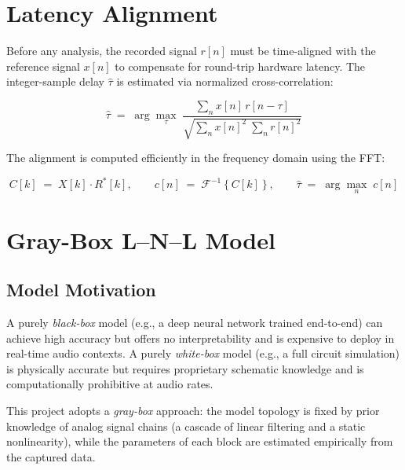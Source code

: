 \documentclass[11pt, letterpaper]{article}
\begin{document}
\section{Latency Alignment}
\label{sec:latency}

Before any analysis, the recorded signal $r[n]$ must be time-aligned with the
reference signal $x[n]$ to compensate for round-trip hardware latency.
The integer-sample delay $\hat{\tau}$ is estimated via normalized
cross-correlation:

\begin{equation}
    \hat{\tau} \;=\; \arg\max_{\tau} \;
    \frac{\displaystyle\sum_{n} x[n]\, r[n - \tau]}
         {\sqrt{\displaystyle\sum_{n} x[n]^{2}\;
                \displaystyle\sum_{n} r[n]^{2}}}
    \label{eq:xcorr}
\end{equation}

The alignment is computed efficiently in the frequency domain using the FFT:

\begin{equation}
    C[k] \;=\; X[k] \cdot R^{*}[k],
    \qquad
    c[n] \;=\; \mathcal{F}^{-1}\!\left\{C[k]\right\},
    \qquad
    \hat{\tau} \;=\; \arg\max_{n}\; c[n]
    \label{eq:xcorr_fft}
\end{equation}


\section{Gray-Box L--N--L Model}
\label{sec:lnl}

\subsection{Model Motivation}
\label{sec:lnl_motivation}

A purely \emph{black-box} model (e.g., a deep neural network trained end-to-end)
can achieve high accuracy but offers no interpretability and is expensive to
deploy in real-time audio contexts.  A purely \emph{white-box} model (e.g., a
full circuit simulation) is physically accurate but requires proprietary
schematic knowledge and is computationally prohibitive at audio rates.

This project adopts a \emph{gray-box} approach: the model topology is fixed by
prior knowledge of analog signal chains (a cascade of linear filtering and a
static nonlinearity), while the parameters of each block are estimated
empirically from the captured data.
\end{document}
